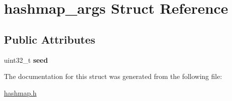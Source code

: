 \hypertarget{structhashmap__args}{}\section{hashmap\+\_\+args Struct Reference}
\label{structhashmap__args}
\subsection*{Public Attributes}
\begin{DoxyCompactItemize}
\item 
uint32\+\_\+t {\bfseries seed}\hypertarget{structhashmap__args_ae512628a8f83e3c1fca257201607b529}{}\label{structhashmap__args_ae512628a8f83e3c1fca257201607b529}

\end{DoxyCompactItemize}


The documentation for this struct was generated from the following file\+:\begin{DoxyCompactItemize}
\item 
\hyperlink{hashmap_8h}{hashmap.\+h}\end{DoxyCompactItemize}
